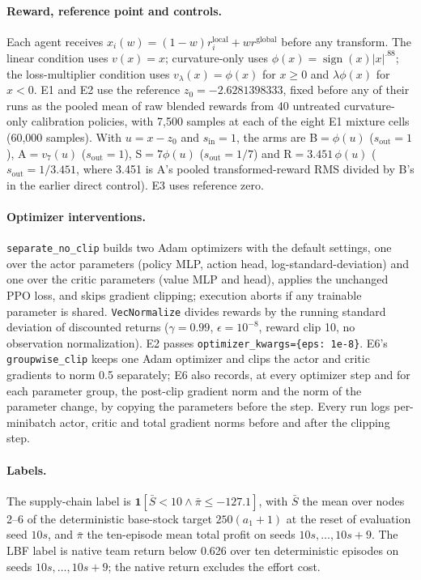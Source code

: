 \paragraph{Reward, reference point and controls.}
Each agent receives $x_i(w)=(1-w)r_i^{\mathrm{local}}+wr^{\mathrm{global}}$ before any transform. The
linear condition uses $v(x)=x$; curvature-only uses $\phi(x)=\operatorname{sign}(x)|x|^{.88}$; the
loss-multiplier condition uses $v_\lambda(x)=\phi(x)$ for $x\ge0$ and $\lambda\phi(x)$ for $x<0$. E1 and
E2 use the reference $z_0=-2.6281398333$, fixed before any of their runs as the pooled mean of raw
blended rewards from 40 untreated curvature-only calibration policies, with 7,500 samples at each of
the eight E1 mixture cells (60,000 samples). With $u=x-z_0$ and
$s_{\mathrm{in}}=1$, the arms are B$=\phi(u)$ ($s_{\mathrm{out}}=1$), A$=v_7(u)$ ($s_{\mathrm{out}}=1$),
S$=7\phi(u)$ ($s_{\mathrm{out}}=1/7$) and R$=3.451\,\phi(u)$ ($s_{\mathrm{out}}=1/3.451$, where 3.451 is
A's pooled transformed-reward RMS divided by B's in the earlier direct control). E3 uses reference zero.

\paragraph{Optimizer interventions.}
\texttt{separate\_no\_clip} builds two Adam optimizers with the default settings, one over the actor
parameters (policy MLP, action head, log-standard-deviation) and one over the critic parameters (value
MLP and head), applies the unchanged PPO loss, and skips gradient clipping; execution aborts if any
trainable parameter is shared. \texttt{VecNormalize} divides rewards by the running standard deviation of
discounted returns ($\gamma=0.99$, $\epsilon=10^{-8}$, reward clip 10, no observation normalization). E2
passes \texttt{optimizer\_kwargs=\{eps: 1e-8\}}. E6's \texttt{groupwise\_clip} keeps one Adam optimizer and
clips the actor and critic gradients to norm 0.5 separately; E6 also records, at every optimizer step and
for each parameter group, the post-clip gradient norm and the norm of the parameter change, by copying the
parameters before the step. Every run logs per-minibatch actor, critic and total
gradient norms before and after the clipping step.

\paragraph{Labels.}
The supply-chain label is $\mathbf{1}[\bar S<10\wedge\bar\pi\le-127.1]$, with $\bar S$ the mean over
nodes 2--6 of the deterministic base-stock target $250(a_1+1)$ at the reset of evaluation seed $10s$,
and $\bar\pi$ the ten-episode mean total profit on seeds $10s,\ldots,10s+9$. The LBF label is native
team return below 0.626 over ten deterministic episodes on seeds $10s,\ldots,10s+9$; the native return
excludes the effort cost.

